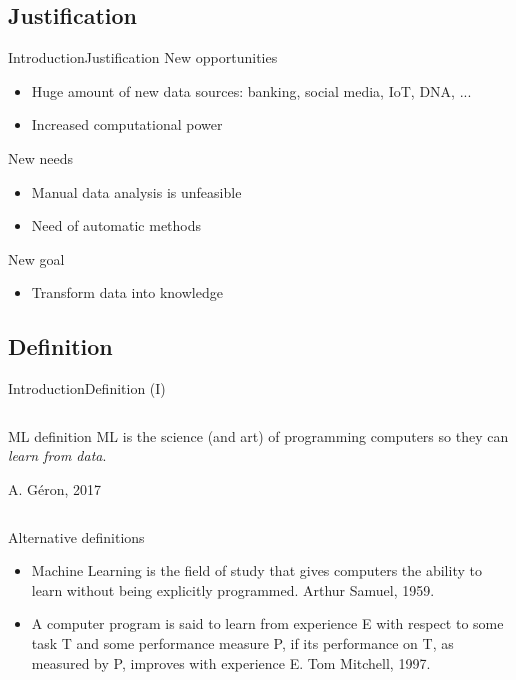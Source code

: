 \documentclass[10pt,compress]{beamer} %
\begin{document}
\subsection{Justification}
\begin{frame}{Introduction}{Justification}
	 New opportunities
	\begin{itemize}
	\item Huge amount of new data sources: banking, social media, IoT, DNA, ...
	\item Increased computational power
	\end{itemize}
	New needs
	\begin{itemize}
	\item Manual data analysis is unfeasible
	\item Need of automatic methods
	\end{itemize}
	New goal
	\begin{itemize}
		\item Transform data into knowledge
	\end{itemize}
\end{frame}

\subsection{Definition}
\begin{frame}{Introduction}{Definition (I)}

	\begin{columns}
	   \begin{block}{ML definition}
		ML is the science (and art) of programming computers so they can \textit{learn from data}.

		\hfill A. G\'eron, 2017
		\end{block}
	\end{columns}

	\bigskip

	Alternative definitions
	\begin{itemize}
	\item Machine Learning is the field of study that gives computers the ability to learn without being explicitly programmed. Arthur Samuel, 1959.
	\item A computer program is said to learn from experience E with respect to some task T and some performance measure P, if its performance on T, as measured by P, improves with experience E. Tom Mitchell, 1997.
	\end{itemize}
\end{frame}
\end{document}
